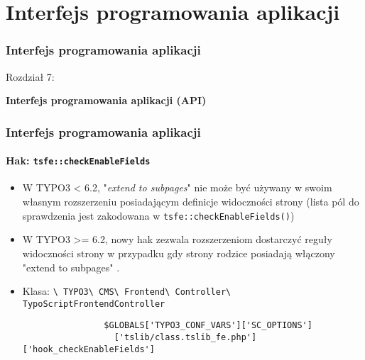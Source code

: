 %
\section{Interfejs programowania aplikacji}
\begin{frame}[fragile]
	\frametitle{Interfejs programowania aplikacji}

	\begin{center}\huge{Rozdział 7:}\end{center}
	\begin{center}\huge{\color{typo3darkgrey}\textbf{Interfejs programowania aplikacji (API)}}\end{center}

\end{frame}


\begin{frame}[fragile]
	\frametitle{Interfejs programowania aplikacji}
	\framesubtitle{Hak: \texttt{tsfe::checkEnableFields}}

	\begin{itemize}
		\item W TYPO3 < 6.2, "\emph{extend to subpages}" nie może być używany w swoim własnym rozszerzeniu posiadającym definicje widoczności strony\newline
			\small(lista pól do sprawdzenia jest zakodowana w \texttt{tsfe::checkEnableFields()})\normalsize

		\item W TYPO3 >= 6.2, nowy hak zezwala rozszerzeniom dostarczyć reguły widoczności strony w przypadku gdy strony rodzice posiadają włączony "extend to subpages" .
		\item Klasa:\newline
			\smaller
				\texttt{\textbackslash
					TYPO3\textbackslash
					CMS\textbackslash
					Frontend\textbackslash
					Controller\textbackslash
					TypoScriptFrontendController}\normalsize

			\lstset{
				basicstyle=\smaller\ttfamily
			}

			\begin{lstlisting}
				$GLOBALS['TYPO3_CONF_VARS']['SC_OPTIONS']
				  ['tslib/class.tslib_fe.php']['hook_checkEnableFields']
			\end{lstlisting}

	\end{itemize}

\end{frame}

